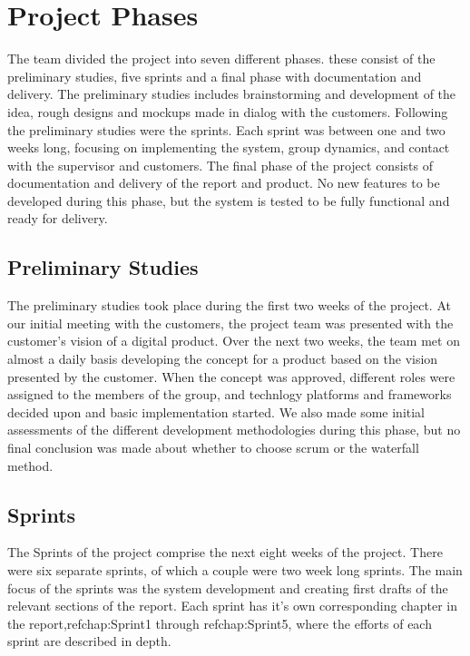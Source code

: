 \section{Project Phases}
\label{sec:PlanningProjPhases}
The team divided the project into seven different phases. these consist of the preliminary studies, five sprints and a final phase with documentation and delivery. The preliminary studies includes brainstorming and development of the idea, rough designs and mockups made in dialog with the customers. Following the preliminary studies were the sprints. Each sprint was between one and two weeks long, focusing on implementing the system, group dynamics, and contact with the supervisor and customers. The final phase of the project consists of documentation and delivery of the report and product. No new features to be developed during this phase, but the system is tested to be fully functional and ready for delivery. 

\subsection{Preliminary Studies}
\label{subsec:PlanningProjPhasesPrelim}
The preliminary studies took place during the first two weeks of the project. At our initial meeting with the customers, the project team was presented with the customer’s vision of a digital product. Over the next two weeks, the team met on almost a daily basis developing the concept for a product based on the vision presented by the customer. When the concept was approved, different roles were assigned to the members of the group, and technlogy platforms and frameworks decided upon and basic implementation started. We also made some initial assessments of the different development methodologies during this phase, but no final conclusion was made about whether to choose scrum or the waterfall method.

\subsection{Sprints}
\label{subsec:PlanningProjPhasesSprints}
The Sprints of the project comprise the next eight weeks of the project. There were six separate sprints, of which a couple were two week long sprints. The main focus of the sprints was the system development and creating first drafts of the relevant sections of the report. Each sprint has it’s own corresponding chapter in the report,ref{chap:Sprint1} through ref{chap:Sprint5}, where the efforts of each sprint are described in depth.

